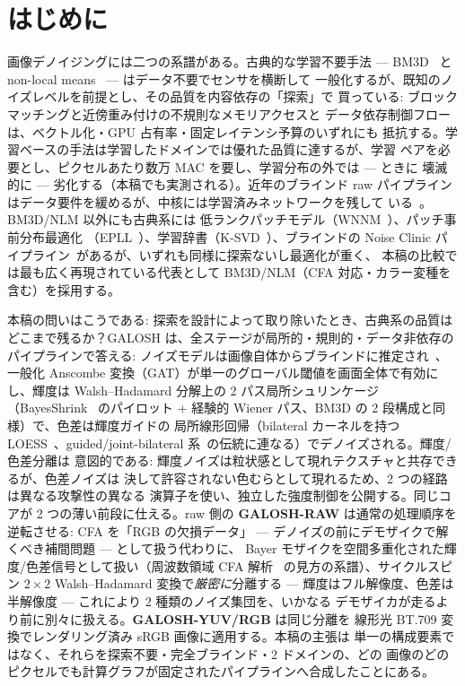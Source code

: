 \documentclass[journal]{IEEEtran}
\begin{document}
\section{はじめに}
画像デノイジングには二つの系譜がある。古典的な学習不要手法 ---
BM3D~\cite{bm3d} と non-local means~\cite{nlm} --- はデータ不要でセンサを横断して
一般化するが、既知のノイズレベルを前提とし、その品質を内容依存の「探索」で
買っている: ブロックマッチングと近傍重み付けの不規則なメモリアクセスと
データ依存制御フローは、ベクトル化・GPU 占有率・固定レイテンシ予算のいずれにも
抵抗する。学習ベースの手法は学習したドメインでは優れた品質に達するが、学習
ペアを必要とし、ピクセルあたり数万 MAC を要し、学習分布の外では --- ときに
壊滅的に --- 劣化する（本稿でも実測される）。近年のブラインド raw
パイプラインはデータ要件を緩めるが、中核には学習済みネットワークを残して
いる~\cite{yond,noise2vst}。BM3D/NLM 以外にも古典系には
低ランクパッチモデル（WNNM~\cite{wnnm}）、パッチ事前分布最適化
（EPLL~\cite{epll}）、学習辞書（K-SVD~\cite{ksvd}）、ブラインドの Noise Clinic
パイプライン~\cite{noiseclinic}があるが、いずれも同様に探索ないし最適化が重く、
本稿の比較では最も広く再現されている代表として BM3D/NLM（CFA 対応・カラー変種を
含む）を採用する。

本稿の問いはこうである: 探索を設計によって取り除いたとき、古典系の品質は
どこまで残るか？GALOSH は、全ステージが局所的・規則的・データ非依存の
パイプラインで答える: ノイズモデルは画像自体からブラインドに推定され~\cite{foi}、
一般化 Anscombe 変換（GAT）が単一のグローバル閾値を画面全体で有効にし、輝度は
Walsh--Hadamard 分解上の 2 パス局所シュリンケージ（BayesShrink~\cite{bayesshrink}
のパイロット + 経験的 Wiener パス、BM3D の 2 段構成と同様）で、色差は輝度ガイドの
局所線形回帰（bilateral カーネルを持つ LOESS~\cite{loess}、guided/joint-bilateral
系~\cite{kopf,guidedfilter}の伝統に連なる）でデノイズされる。輝度/色差分離は
意図的である: 輝度ノイズは粒状感として現れテクスチャと共存できるが、色差ノイズは
決して許容されない色むらとして現れるため、2 つの経路は異なる攻撃性の異なる
演算子を使い、独立した強度制御を公開する。同じコアが 2 つの薄い前段に仕える。raw 側の
\textbf{GALOSH-RAW} は通常の処理順序を逆転させる: CFA を「RGB の欠損データ」
--- デノイズの前にデモザイクで解くべき補間問題 --- として扱う代わりに、
Bayer モザイクを空間多重化された輝度/色差信号として扱い（周波数領域 CFA 解析
~\cite{alleysson,dubois,hirakawa}の見方の系譜）、サイクルスピン $2{\times}2$ Walsh--Hadamard
変換で\emph{厳密に}分離する --- 輝度はフル解像度、色差は半解像度 ---
これにより 2 種類のノイズ集団を、いかなる
デモザイカが走るより前に別々に扱える。\textbf{GALOSH-YUV/RGB} は同じ分離を
線形光 BT.709 変換でレンダリング済み sRGB 画像に適用する。本稿の主張は
単一の構成要素ではなく、それらを探索不要・完全ブラインド・2 ドメインの、どの
画像のどのピクセルでも計算グラフが固定されたパイプラインへ合成したことにある。
\end{document}
